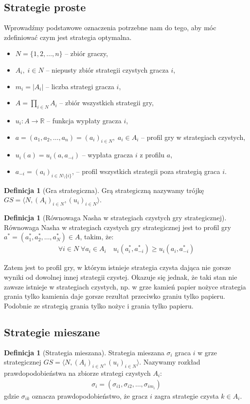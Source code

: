 \documentclass[inzynierska]{pwr_wmat_praca_dyplomowa}
\theoremstyle{plain}
\numberwithin{theorem}{chapter}
\theoremstyle{definition}
\numberwithin{theorem}{chapter}
\newtheorem{definition}[theorem]{Definicja}
\begin{document}
\subsection{Strategie proste}
Wprowadźmy podstawowe oznaczenia potrzebne nam do tego, aby móc zdefiniować czym jest strategia optymalna.
\begin{itemize}
	\item $ N = \{1,2,\dots, n\} $ -- zbiór graczy,
	\item $A_i,\; i \in N $ -- niepusty zbiór strategii  czystych gracza $i$,
	\item $m_i = |A_i|$ -- liczba strategi gracza $i$,
	\item $A = \displaystyle\prod_{i \in N} A_i$ -- zbiór wszystkich strategii gry, 
	\item $u_i : A \rightarrow \mathbb{R} $ -- funkcja wypłaty gracza $i$,
	\item $a=(a_1,a_2,\dots,a_n)=(a_i)_{i \in N},\; a_i \in A_i$ -- profil gry w strategiach czystych,
	\item $u_i(a) = u_i(a,a_{-i})$ -- wypłata gracza $i$ z profilu $a$,
	\item $a_{-i} = (a_i)_{i\in N \setminus \{i\}}$, -- profil wszystkich strategii poza strategią graca $i$.
\end{itemize}
	\begin{definition}[Gra strategiczna]
		Grą strategiczną nazywamy trójkę $GS = \langle N, (A_i)_{i \in N},(u_i)_{i \in N} \rangle $.
	\end{definition}
	
	\begin{definition}[Równowaga Nasha w strategiach czystych gry strategicznej]
		Równowaga Nasha w strategiach czystych gry strategicznej jest to profil gry $a^*= (a_1^*,a_2^*,\dots,a_N^*)\in A$, takim, że:
		\begin{align*}
			\mathop{\forall}{i \in N}\;
			\mathop{\forall}{a_i \in A_i} \quad
			u_i(a_i^*,a_{-i}^*) \ge u_i(a_i, a_{-i}^*)
		\end{align*}
	\end{definition}
	Zatem jest to profil gry, w którym istnieje strategia czysta dająca nie gorsze wyniki od dowolnej innej strategii czystej.
	Okazuje się jednak, że taki stan nie zawsze istnieje w strategiach czystych, np. w grze kamień papier nożyce strategia grania tylko kamienia daje gorsze rezultat przeciwko graniu tylko papieru. Podobnie ze strategią grania tylko nożyc i grania tylko papieru.
	\subsection{Strategie mieszane}
	\begin{definition}[Strategia mieszana]
		Strategia mieszana $\sigma_i$ graca $i$ w grze strategicznej $GS = \langle N, (A_i)_{i \in N},(u_i)_{i \in N} \rangle $. Nazywamy rozkład prawdopodobieństwa na zbiorze strategi czystych $A_i$:
		\begin{align*}
			\sigma_i = (\sigma_{i1}, \sigma_{i2},\dots,\sigma_{im_i})
		\end{align*}
	gdzie $\sigma_{ik}$ oznacza prawdopodobieństwo, że gracz $i$ zagra strategie czysta $k\in A_i$.  
	\end{definition}
\end{document}

